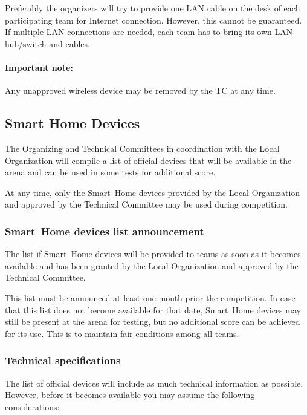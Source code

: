 Preferably the organizers will try to provide one LAN cable on the desk of each participating team for Internet connection. However, this cannot be guaranteed. If multiple LAN connections are needed, each team has to bring its own LAN hub/switch and cables.

\paragraph*{Important note:} Any unapproved wireless device may be removed by the TC at any time.

\subsection{Smart Home Devices}
\label{rule:smarthomedevices}

The Organizing and Technical Committees in coordination with the Local Organization will compile a list of  official devices that will be available in the arena and can be used in some tests for additional score.

At any time, only the Smart~Home devices provided by the Local Organization and approved by the Technical Committee may be used during competition.

\subsubsection{Smart~Home devices list announcement}
The list if Smart~Home devices will be provided to teams as soon as it becomes available and has been granted by the Local Organization and approved by the Technical Committee. 

This list must be announced at least one month prior the competition. In case that this list does not become available for that date, Smart~Home devices may still be present at the arena for testing, but no additional score can be achieved for its use. This is to maintain fair conditions among all teams.

\subsubsection{Technical specifications}
The list of  official devices will include as much technical information as possible. However, before it becomes available you may assume the following considerations:

